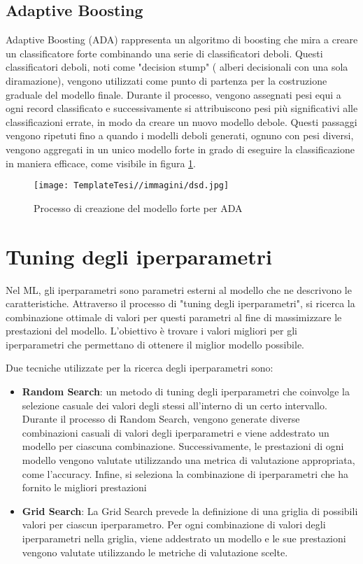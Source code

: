 \begin{flushleft}
\subsection{Adaptive Boosting }
Adaptive Boosting (ADA) rappresenta un algoritmo di boosting che mira a creare un classificatore forte combinando una serie di classificatori deboli. Questi classificatori deboli, noti come "decision stump" ( alberi decisionali con una sola diramazione), vengono utilizzati come punto di partenza per la costruzione graduale del modello finale. 
Durante il processo, vengono assegnati pesi equi a ogni record classificato e successivamente si attribuiscono pesi più significativi alle classificazioni errate, in modo da creare un nuovo modello debole\cite{ada1}. Questi passaggi vengono ripetuti fino a quando i modelli deboli generati, ognuno con pesi diversi, vengono aggregati in un unico modello forte in grado di eseguire la classificazione in maniera efficace, come visibile in figura \ref{fig:ada}\cite{ada2}.

\begin{figure}[H]
    \centering
    \texttt{[image: TemplateTesi//immagini/dsd.jpg]}
    \caption{Processo di creazione del modello forte per ADA \cite{ada2}}
    \label{fig:ada}
\end{figure}
\section{Tuning degli iperparametri}
Nel ML, gli iperparametri sono parametri esterni al modello che ne descrivono le caratteristiche. Attraverso il processo di "tuning degli iperparametri", si ricerca la combinazione ottimale di valori per questi parametri al fine di massimizzare le prestazioni del modello. L'obiettivo è trovare i valori migliori per gli iperparametri che permettano di ottenere il miglior modello possibile.

Due tecniche utilizzate per la ricerca degli iperparametri sono:
\begin{itemize}
    \item \textbf{Random Search}:
    un metodo di tuning degli iperparametri che coinvolge la selezione casuale dei valori degli stessi all'interno di un certo intervallo. Durante il processo di Random Search, vengono generate diverse combinazioni casuali di valori degli iperparametri e viene addestrato un modello per ciascuna combinazione. Successivamente, le prestazioni di ogni modello vengono valutate utilizzando una metrica di valutazione appropriata, come l'accuracy. Infine, si seleziona la combinazione di iperparametri che ha fornito le migliori prestazioni
    \item \textbf{Grid Search}:
    La Grid Search prevede la definizione di una griglia di possibili valori per ciascun iperparametro. Per ogni combinazione di valori degli iperparametri nella griglia, viene addestrato un modello e le sue prestazioni vengono valutate utilizzando le metriche di valutazione scelte.


\end{itemize}
\end{flushleft}
